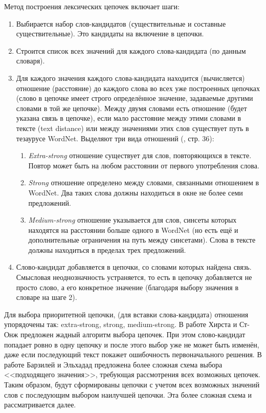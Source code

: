 \documentclass{article}
\begin{document}
\begin{articletext}
Метод построения лексических цепочек включает шаги:

\begin{enumerate} 
\item Выбирается набор слов-кандидатов (существительные и составные существительные). Это кандидаты на включение в цепочки.
\item Строится список всех значений для каждого слова-кандидата (по данным словаря).
\item Для каждого значения каждого слова-кандидата находится (вычисляется) отношение (расстояние) до каждого слова во всех уже построенных цепочках (слово в цепочке имеет строго определённое значение, задаваемые другими словами в той же цепочке). Между двумя словами есть отношение (будет указана связь в цепочке), если мало расстояние между этими словами в тексте (text distance) или между значениями этих слов существует путь в тезаурусе WordNet. Выделяют три вида отношений (\cite{Do Thuy Duong 2011}, стр. 36):
\begin{enumerate} 
\item \textit{Extra-strong} отношение существует для слов, повторяющихся в тексте. Повтор может быть на любом расстоянии от первого употребления слова.
\item \textit{Strong} отношение определено между словами, связанными отношением в WordNet. Два таких слова должны находиться в окне не более семи предложений.
\item \textit{Medium-strong} отношение указывается для слов, синсеты которых находятся на расстоянии больше одного в WordNet (но есть ещё и дополнительные ограничения на путь между синсетами). Слова в тексте должны находиться в пределах трех предложений.
\end{enumerate} 
\item Слово-кандидат добавляется в цепочки, со словами которых найдена связь. Смысловая неоднозначность устраняется, то есть в цепочку добавляется не просто слово, а его конкретное значение (благодаря выбору значения в словаре на шаге 2).
\end{enumerate} 

Для выбора приоритетной цепочки, (для вставки слова-кандидата) отношения упорядочены так: extra-strong, strong, medium-strong. В работе Хирста и Ст-Онж \cite{Hirst St-Onge 1998} предложен жадный алгоритм выбора цепочек. При этом слово-кандидат попадает ровно в одну цепочку и после этого выбор уже не может быть изменён, даже если последующий текст покажет ошибочность первоначального решения. В работе Барзилей и Эльхадад \cite{Barzilay Elhadad 1997} предложена более сложная схема выбора <<подходящего значения>>, требующая рассмотрения всех возможных цепочек. Таким образом, будут сформированы цепочки с учетом всех возможных значений слов с последующим выбором наилучшей цепочки. Эта более сложная схема и рассматривается далее.


\end{articletext}
\end{document}
